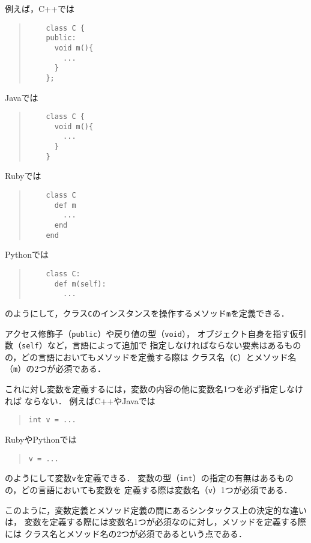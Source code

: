 \documentclass[a4paper,11pt,dvipdfmx]{jreport}
\begin{document}
例えば，C++では
\begin{quote}
	\begin{verbatim}
	class C {
	public:
	  void m(){
	    ...
	  }
	};
	\end{verbatim}
\end{quote}
Javaでは
\begin{quote}
	\begin{verbatim}
	class C {
	  void m(){
	    ...
	  }
	}
	\end{verbatim}
\end{quote}
Rubyでは
\begin{quote}
	\begin{verbatim}
	class C
	  def m
	    ...
	  end
	end
	\end{verbatim}
\end{quote}
Pythonでは
\begin{quote}
	\begin{verbatim}
	class C:
	  def m(self):
	    ...
	\end{verbatim}
\end{quote}
のようにして，クラス\verb|C|のインスタンスを操作するメソッド\verb|m|を定義できる．

アクセス修飾子（\verb|public|）や戻り値の型（\verb|void|），
オブジェクト自身を指す仮引数（\verb|self|）など，言語によって追加で
指定しなければならない要素はあるものの，どの言語においてもメソッドを定義する際は
クラス名（\verb|C|）とメソッド名（\verb|m|）の2つが必須である．

これに対し変数を定義するには，変数の内容の他に変数名1つを必ず指定しなければ
ならない．
例えばC++やJavaでは
\begin{quote}
\begin{verbatim}
int v = ...
\end{verbatim}
\end{quote}
RubyやPythonでは
\begin{quote}
\begin{verbatim}
v = ...
\end{verbatim}
\end{quote}
のようにして変数\verb|v|を定義できる．
変数の型（\verb|int|）の指定の有無はあるものの，どの言語においても変数を
定義する際は変数名（\verb|v|）1つが必須である．

このように，変数定義とメソッド定義の間にあるシンタックス上の決定的な違いは，
変数を定義する際には変数名1つが必須なのに対し，メソッドを定義する際には
クラス名とメソッド名の2つが必須であるという点である．
\end{document}
